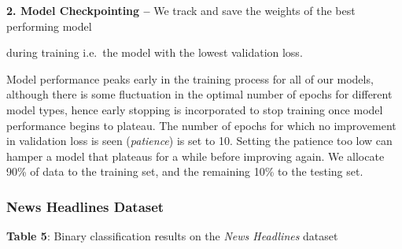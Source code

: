 \documentclass[12pt,a4paper]{article}
\begin{document}
\hspace{10pt}\textbf{2. Model Checkpointing --} We track and save the weights of the best performing model\\\vspace{-15pt}

\hspace{23pt}during training i.e.\ the model with the lowest validation loss.\\\vspace{-10pt}

\noindent Model performance peaks early in the training process for all of our models, although there is some fluctuation in the optimal number of epochs for different model types, hence early stopping is incorporated to stop training once model performance begins to plateau. The number of epochs for which no improvement in validation loss is seen (\textit{patience}) is set to 10. Setting the patience too low can hamper a model that plateaus for a while before improving again. We allocate 90\% of data to the training set, and the remaining 10\% to the testing set.\vspace{-5pt}

\subsubsection{News Headlines Dataset}
\begin{center}
	\textbf{Table 5}: Binary classification results on the \textit{News Headlines} dataset\vspace{-5pt}
\end{center}
\end{document}
